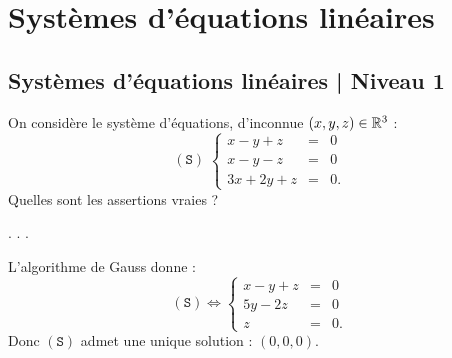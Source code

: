

\section{Systèmes d'équations linéaires}
\subsection{Systèmes d'équations linéaires | Niveau 1 }

\begin{question}
On considère le système d'équations, d'inconnue $(x,y,z)\in \mathbb{R}^3$ : 
$$(\mathtt{S})\; \left\{\begin{array}{rcc}x-y+z&=&0\\
x-y-z&=&0\\ 3x+2y+z&=&0. \end{array}\right.$$
Quelles sont les assertions vraies ?
\begin{answers} 
.
.
.
\end{answers}
\begin{explanations}  L'algorithme de Gauss donne :
$$ (\mathtt{S})  \Leftrightarrow  \left\{\begin{array}{rcc}
x-y+z&=&0\\
5y-2z&=&0\\ 
z&=&0.\end{array}\right.$$
Donc $(\mathtt{S})$ admet une unique solution : $(0,0,0)$.
\end{explanations}
\end{question}


